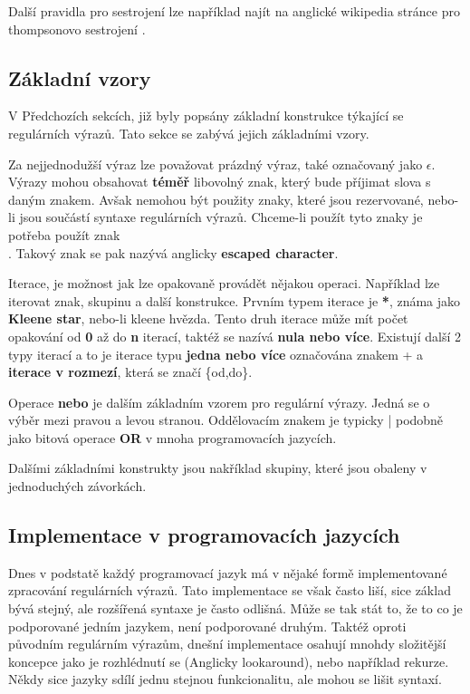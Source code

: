 Další pravidla pro sestrojení lze například najít na anglické wikipedia stránce pro thompsonovo sestrojení \cite{Wikipedia_2023}.

\subsection*{Základní vzory}
V Předchozích sekcích, již byly popsány základní konstrukce týkající se regulárních výrazů.
Tato sekce se zabývá jejich základními vzory.

Za nejjednodužší výraz lze považovat prázdný výraz, také označovaný jako $\epsilon$. 
Výrazy mohou obsahovat \textbf{téměř} libovolný znak, který bude příjimat slova s daným znakem. 
Avšak nemohou být použity znaky, které jsou rezervované, nebo-li jsou součástí syntaxe regulárních výrazů.
Chceme-li použít tyto znaky je potřeba použít znak \textbf{\\}. 
Takový znak se pak nazývá anglicky \textbf{escaped character}.

Iterace, je možnost jak lze opakovaně provádět nějakou operaci.
Například lze iterovat znak, skupinu a další konstrukce.
Prvním typem iterace je \textbf{*}, známa jako \textbf{Kleene star}, nebo-li kleene hvězda.
Tento druh iterace může mít počet opakování od \textbf{0} až do \textbf{n} iterací, taktéž se nazívá \textbf{nula nebo více}. 
Existují další 2 typy iterací a to je iterace typu \textbf{jedna nebo více} označována znakem + a \textbf{iterace v rozmezí}, která se značí \{od,do\}.

Operace \textbf{nebo} je dalším základním vzorem pro regulární výrazy. 
Jedná se o výběr mezi pravou a levou stranou. Oddělovacím znakem je typicky | podobně jako bitová operace \textbf{OR} v mnoha programovacích jazycích.

Dalšími základními konstrukty jsou nakříklad skupiny, které jsou obaleny v jednoduchých závorkách. 

\subsection*{Implementace v programovacích jazycích}\label{sec:impipl}

Dnes v podstatě každý programovací jazyk má v nějaké formě implementované zpracování regulárních výrazů.
Tato implementace se však často liší, sice základ bývá stejný, ale rozšířená syntaxe je často odlišná.
Může se tak stát to, že to co je podporované jedním jazykem, není podporované druhým.
Taktéž oproti původním regulárním výrazům, dnešní implementace osahují mnohdy složitější
koncepce jako je rozhlédnutí se (Anglicky lookaround), nebo například rekurze.
Někdy sice jazyky sdílí jednu stejnou funkcionalitu, ale mohou se lišit syntaxí.

